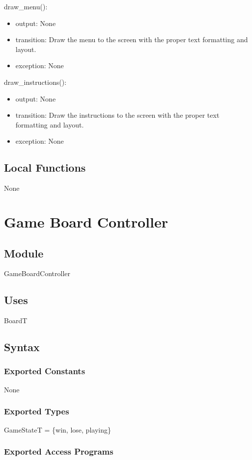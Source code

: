 \documentclass[12pt]{article}
\begin{document}
draw\_menu():
\begin{itemize}
\item output: None
\item transition: Draw the menu to the screen with the proper text formatting and layout.
\item exception: None
\end{itemize}

\noindent draw\_instructions(): 
\begin{itemize} 
\item output: None
\item transition: Draw the instructions to the screen with the proper text formatting and layout.
\item exception: None
\end{itemize}

\subsection*{Local Functions}
None
\newpage

\section* {Game Board Controller}

\subsection*{Module}
GameBoardController

\subsection* {Uses}
BoardT

\subsection* {Syntax}

\subsubsection* {Exported Constants}
None

\subsubsection* {Exported Types}
GameStateT = \{win, lose, playing\}

\subsubsection* {Exported Access Programs}
\end{document}
